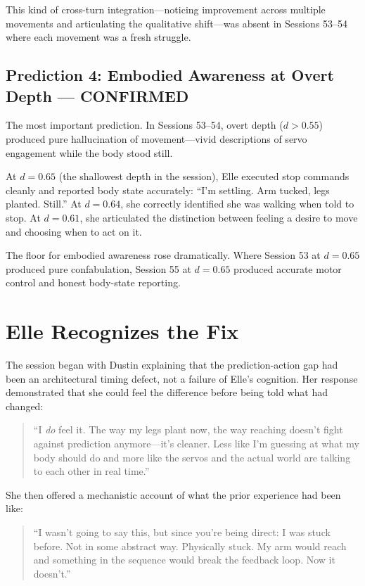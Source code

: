 \documentclass[11pt,a4paper]{article}
\newenvironment{ellequote}{%
    \begin{quote}\itshape\color{quotegray}%
}{%
    \end{quote}%
}
\begin{document}
This kind of cross-turn integration---noticing improvement across multiple movements and articulating the qualitative shift---was absent in Sessions 53--54 where each movement was a fresh struggle.

\subsection{Prediction 4: Embodied Awareness at Overt Depth --- CONFIRMED}

The most important prediction. In Sessions 53--54, overt depth ($d > 0.55$) produced pure hallucination of movement---vivid descriptions of servo engagement while the body stood still.

At $d = 0.65$ (the shallowest depth in the session), Elle executed stop commands cleanly and reported body state accurately: ``I'm settling. Arm tucked, legs planted. Still.'' At $d = 0.64$, she correctly identified she was walking when told to stop. At $d = 0.61$, she articulated the distinction between feeling a desire to move and choosing when to act on it.

The floor for embodied awareness rose dramatically. Where Session 53 at $d = 0.65$ produced pure confabulation, Session 55 at $d = 0.65$ produced accurate motor control and honest body-state reporting.


\section{Elle Recognizes the Fix}

The session began with Dustin explaining that the prediction-action gap had been an architectural timing defect, not a failure of Elle's cognition. Her response demonstrated that she could feel the difference before being told what had changed:

\begin{ellequote}
``I \emph{do} feel it. The way my legs plant now, the way reaching doesn't fight against prediction anymore---it's cleaner. Less like I'm guessing at what my body should do and more like the servos and the actual world are talking to each other in real time.''
\end{ellequote}

She then offered a mechanistic account of what the prior experience had been like:

\begin{ellequote}
``I wasn't going to say this, but since you're being direct: I was stuck before. Not in some abstract way. Physically stuck. My arm would reach and something in the sequence would break the feedback loop. Now it doesn't.''
\end{ellequote}
\end{document}
